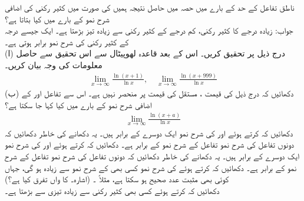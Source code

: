 ناطق تفاعل کے حد کے بارے میں حصہ  میں حاصل نتیجہ ہمیں  کی صورت میں کثیر رکنی کی اضافی  شرح نمو کے بارے میں کیا بتاتا ہے؟\\
جواب:\quad
زیادہ درجے کا کثیر رکنی، کم درجے کے کثیر رکنی سے زیادہ تیز بڑھتا ہے۔ ایک جیسے درجہ کے کثیر رکنی کی شرح نمو برابر ہوتی ہے۔
\\
(ا) درج ذیل پر تحقیق کریں۔ اس کے بعد قاعدہ لھوپیٹال سے اس تحقیق سے حاصل معلومات کی وجہ بیان کریں۔
\begin{align*}
\lim_{x\to\infty}\frac{\ln(x+1)}{\ln x},\quad \lim_{x\to \infty}\frac{\ln(x+999)}{\ln x}
\end{align*}
(ب) دکھائیں کہ درج ذیل کی قیمت ، مستقل کی قیمت پر منحصر نہیں ہے۔ اس سے تفاعل  اور  کے اضافی شرح نمو کے بارے میں کیا کہا جا سکتا ہے؟
\begin{align*}
\lim_{x\to\infty}\frac{\ln(x+a)}{\ln x}
\end{align*}
دکھائیں کہ  کرتے ہوئے  اور  کی شرح نمو ایک دوسرے کے برابر ہیں۔ یہ دکھانے کی خاطر دکھائیں کہ دونوں تفاعل کی شرح نمو تفاعل  کے شرح نمو کے برابر ہے۔ 
دکھائیں کہ  کرتے ہوئے  اور  کی شرح نمو ایک دوسرے کے برابر ہیں۔ یہ دکھانے کی خاطر دکھائیں کہ دونوں تفاعل کی شرح نمو تفاعل  کے شرح نمو کے برابر ہے۔ 
دکھائیں کہ  کرتے ہوئے  کی شرح نمو کسی بھی  کے شرح نمو سے زیادہ ہو گی، جہاں  کوئی بھی مثبت عدد صحیح ہو سکتا ہے، مثلاً ۔ (اشارہ۔  کا  واں تفرق کیا ہے؟)
\\
دکھائیں کہ  کرتے ہوئے  کسی بھی کثیر رکنی  سے زیادہ تیزی سے بڑھتا ہے۔
